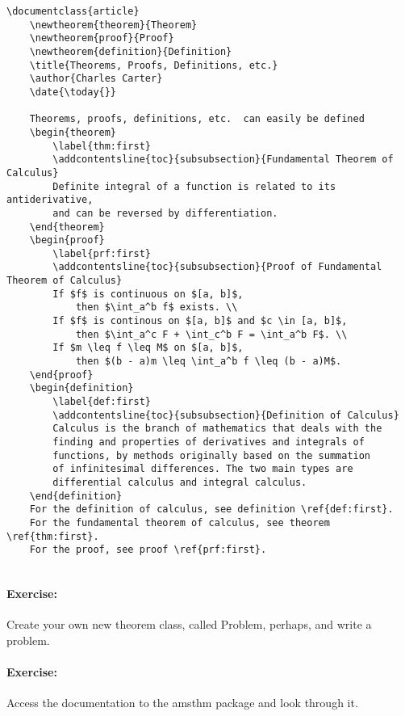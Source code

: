         \begin{verbatim}
\documentclass{article}
    \newtheorem{theorem}{Theorem}
    \newtheorem{proof}{Proof}
    \newtheorem{definition}{Definition}
    \title{Theorems, Proofs, Definitions, etc.}
    \author{Charles Carter}
    \date{\today{}}

    Theorems, proofs, definitions, etc.  can easily be defined
    \begin{theorem}
        \label{thm:first}
        \addcontentsline{toc}{subsubsection}{Fundamental Theorem of Calculus}
        Definite integral of a function is related to its antiderivative, 
        and can be reversed by differentiation.
    \end{theorem}
    \begin{proof}
        \label{prf:first}
        \addcontentsline{toc}{subsubsection}{Proof of Fundamental Theorem of Calculus}
        If $f$ is continuous on $[a, b]$, 
            then $\int_a^b f$ exists. \\
        If $f$ is continous on $[a, b]$ and $c \in [a, b]$, 
            then $\int_a^c F + \int_c^b F = \int_a^b F$. \\
        If $m \leq f \leq M$ on $[a, b]$, 
            then $(b - a)m \leq \int_a^b f \leq (b - a)M$.
    \end{proof}
    \begin{definition}
        \label{def:first}
        \addcontentsline{toc}{subsubsection}{Definition of Calculus}
        Calculus is the branch of mathematics that deals with the 
        finding and properties of derivatives and integrals of 
        functions, by methods originally based on the summation 
        of infinitesimal differences. The two main types are 
        differential calculus and integral calculus.
    \end{definition}
    For the definition of calculus, see definition \ref{def:first}. 
    For the fundamental theorem of calculus, see theorem \ref{thm:first}. 
    For the proof, see proof \ref{prf:first}.
    
        \end{verbatim}

        \paragraph{Exercise:} Create your own new theorem class, called Problem, perhaps, and write a problem.

        \paragraph{Exercise:} Access the documentation to the amsthm package and look through it.


